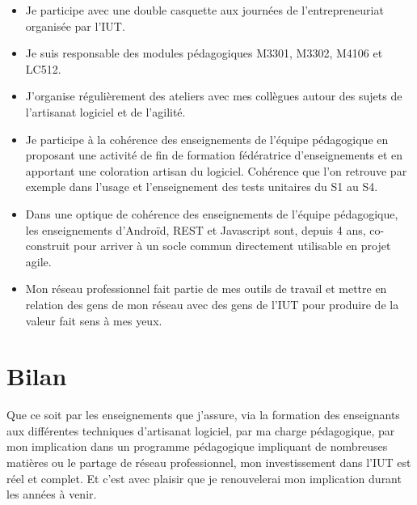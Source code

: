 \documentclass[a4paper]{article}
\begin{document}
\begin{itemize}
  \item Je participe avec une double casquette aux journées de l'entrepreneuriat organisée par l'IUT.
  \item Je suis responsable des modules pédagogiques M3301, M3302, M4106 et LC512.
  \item J'organise régulièrement des ateliers avec mes collègues autour des sujets de l'artisanat logiciel et de l'agilité.
  \item Je participe à la cohérence des enseignements de l'équipe pédagogique en proposant une activité de fin de formation fédératrice d'enseignements et en apportant une coloration artisan du logiciel. Cohérence que l'on retrouve par exemple dans l'usage et l'enseignement des tests unitaires du S1 au S4.
  \item Dans une optique de cohérence des enseignements de l'équipe pédagogique, les enseignements d'Androïd, REST et Javascript sont, depuis 4 ans, co-construit pour arriver à un socle commun directement utilisable en projet agile.
  \item Mon réseau professionnel fait partie de mes outils de travail et mettre en relation des gens de mon réseau avec des gens de l'IUT pour produire de la valeur fait sens à mes yeux.
\end{itemize}


\section{Bilan}

Que ce soit par les enseignements que j'assure, via la formation des enseignants aux différentes techniques d'artisanat logiciel, par ma charge pédagogique, par mon implication dans un programme pédagogique impliquant de nombreuses matières ou le partage de réseau professionnel, mon investissement dans l'IUT est réel et complet. Et c'est avec plaisir que je renouvelerai mon implication durant les années à venir.
\end{document}
